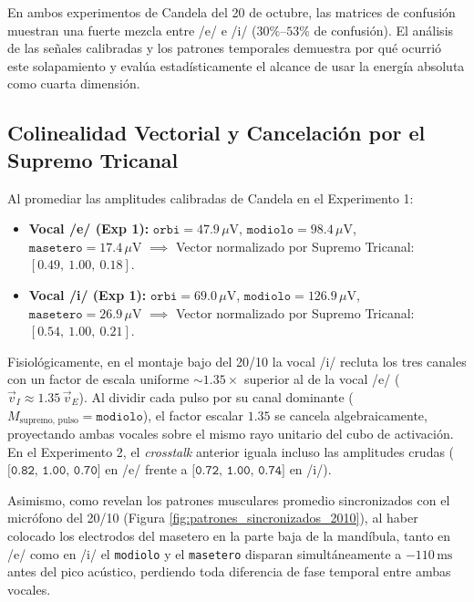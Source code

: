 \documentclass[11pt,a4paper]{article}
\begin{document}
En ambos experimentos de Candela del 20 de octubre, las matrices de confusión muestran una fuerte mezcla entre /e/ e /i/ ($30\%\text{--}53\%$ de confusión). El análisis de las señales calibradas y los patrones temporales demuestra por qué ocurrió este solapamiento y evalúa estadísticamente el alcance de usar la energía absoluta como cuarta dimensión.

\subsection{Colinealidad Vectorial y Cancelación por el Supremo Tricanal}
Al promediar las amplitudes calibradas de Candela en el Experimento 1:
\begin{itemize}
    \item \textbf{Vocal /e/ (Exp 1):} $\texttt{orbi} = 47.9\,\mu\text{V}$, $\texttt{modiolo} = 98.4\,\mu\text{V}$, $\texttt{masetero} = 17.4\,\mu\text{V}$ $\implies$ Vector normalizado por Supremo Tricanal: $\mathbf{[0.49,\ 1.00,\ 0.18]}$.
    \item \textbf{Vocal /i/ (Exp 1):} $\texttt{orbi} = 69.0\,\mu\text{V}$, $\texttt{modiolo} = 126.9\,\mu\text{V}$, $\texttt{masetero} = 26.9\,\mu\text{V}$ $\implies$ Vector normalizado por Supremo Tricanal: $\mathbf{[0.54,\ 1.00,\ 0.21]}$.
\end{itemize}
Fisiológicamente, en el montaje bajo del 20/10 la vocal /i/ recluta los tres canales con un factor de escala uniforme $\sim 1.35\times$ superior al de la vocal /e/ ($\vec{v}_I \approx 1.35\,\vec{v}_E$). Al dividir cada pulso por su canal dominante ($M_{\text{supremo, pulso}} = \texttt{modiolo}$), el factor escalar $1.35$ se cancela algebraicamente, proyectando ambas vocales sobre el mismo rayo unitario del cubo de activación. En el Experimento 2, el \textit{crosstalk} anterior iguala incluso las amplitudes crudas ($\texttt{[0.82, 1.00, 0.70]}$ en /e/ frente a $\texttt{[0.72, 1.00, 0.74]}$ en /i/).

Asimismo, como revelan los patrones musculares promedio sincronizados con el micrófono del 20/10 (Figura \ref{fig:patrones_sincronizados_2010}), al haber colocado los electrodos del masetero en la parte baja de la mandíbula, tanto en /e/ como en /i/ el \texttt{modiolo} y el \texttt{masetero} disparan simultáneamente a $-110\,\text{ms}$ antes del pico acústico, perdiendo toda diferencia de fase temporal entre ambas vocales.
\end{document}
